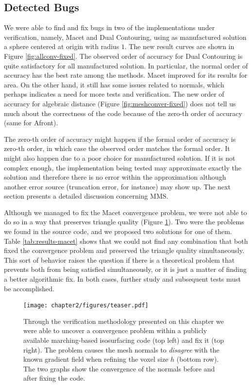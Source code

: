 \subsection{Detected Bugs}

We were able to find and fix bugs in two of the implementations 
under verification, namely, Macet and Dual Contouring, using as  
manufactured solution a sphere centered at origin with radius $1$. 
The new result curves are shown in Figure \ref{fig:allconv-fixed}. The observed 
order of accuracy for Dual Contouring is quite satisfactory for all manufactured 
solution. In particular, the normal order of accuracy has the best rate among the 
methods. Macet improved for its results for area. On the other hand, it still has 
some issues related to normals, which perhaps indicates a need for more tests 
and verification. The new order of accuracy for algebraic 
distance (Figure \ref{fig:meshconver-fixed}) does not tell us 
much about the correctness of the code because of the zero-th order 
of accuracy (same for Afront). 

The zero-th order of accuracy might happen if the formal order of accuracy 
is zero-th order, in which case the observed order matches the formal order. 
It might also happen due to a poor choice for manufactured solution. If 
it is not complex enough, the implementation being tested may approximate 
exactly the solution and therefore there is no error within the approximation 
although another error source (truncation error, for instance) may show up. 
The next section presents a detailed discussion concerning MMS.

Although we managed to fix the Macet convergence problem, we were not 
able to do so in a way that preserves triangle quality (Figure \ref{fig:teaser}).
Two were the problems we found in the source code, and we proposed two 
solutions for one of them. Table \ref{tab:results-macet} shows that we could 
not find any combination that both fixed the convergence problem and preserved the 
triangle quality simultaneously. This sort of behavior raises the question if there 
is a theoretical problem that prevents both from being satisfied simultaneously, 
or it is just a matter of finding a better algorithmic fix. 
In both cases, further study and subsequent tests must be accomplished.

\begin{figure}[b]
\centering
\texttt{[image: chapter2/figures/teaser.pdf]}
\caption{Through the verification methodology presented on this chapter 
we were able to uncover a convergence problem within a publicly available marching-based 
isosurfacing code (top left) and fix it (top right). The problem causes the mesh normals to 
\emph{disagree} with the known gradient field when refining the voxel size $h$ (bottom row). 
The two graphs show the convergence of the normals before and after fixing the code.}
\label{fig:teaser}
\end{figure}

